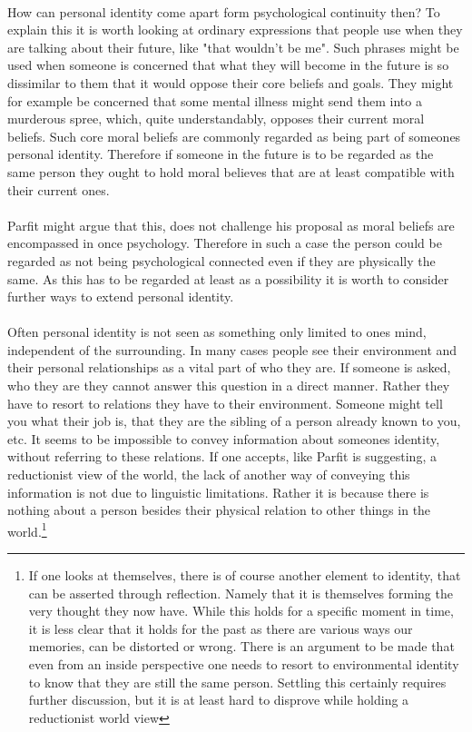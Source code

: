 \documentclass[14pt]{article}
\begin{document}
\\
How can personal identity come apart form psychological continuity then? To explain this it is worth looking at ordinary expressions that people use when they are
talking about their future, like "that wouldn't be me". Such phrases might be used when someone is concerned that what they will become in the future is so
dissimilar to them that it would oppose their core beliefs and goals. They might for example be concerned that some mental illness might send them into a
murderous spree, which, quite understandably, opposes their current moral beliefs. Such core moral beliefs are commonly regarded as being part of someones personal
identity\autocite{sep-plato}. Therefore if someone in the future is to be regarded as the same person they ought to hold moral believes that are at least compatible with their current ones.\\
\\
Parfit might argue that this, does not challenge his proposal as moral beliefs are encompassed in once psychology. Therefore in such a case the person could be regarded
as not being psychological connected even if they are physically the same. As this has to be regarded at least as a possibility it is worth to consider further ways to
extend personal identity.\\
\\
Often personal identity is not seen as something only limited to ones mind, independent of the surrounding. In many cases people see their environment and their
personal relationships as a vital part of who they are. If someone is asked, who they are they cannot answer this question in a direct manner. Rather they have to resort
to relations they have to their environment. Someone might tell you what their job is, that they are the sibling of a person already known to you, etc. It seems to be impossible
to convey information about someones identity, without referring to these relations. If one accepts, like Parfit is suggesting, a reductionist view of the world, the lack
of another way of conveying this information is not due to linguistic limitations. Rather it is because there is nothing about a person besides their physical relation to other
things in the world.\footnote{ If one looks at themselves, there is of course another element to identity, that can be asserted through reflection. Namely that it is themselves
forming the very thought they now have. While this holds for a specific moment in time, it is less clear that it holds for the past as there are various ways our memories, can be distorted or
wrong. There is an argument to be made that even from an inside perspective one needs to resort to environmental identity to know that they are still the same person. Settling
this certainly requires further discussion, but it is at least hard to disprove while holding a reductionist world view }\\ 
\end{document}
